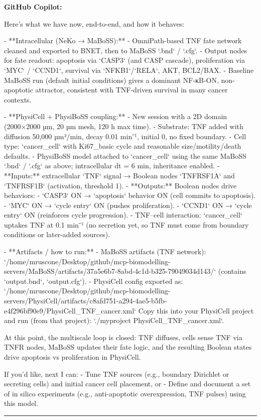 \documentclass[11pt,a4paper]{article}
\begin{document}
\begin{copilotbox}
\textbf{GitHub Copilot:}

Here’s what we have now, end-to-end, and how it behaves:

- **Intracellular (NeKo → MaBoSS):**
  - OmniPath-based TNF fate network cleaned and exported to BNET, then to MaBoSS `.bnd` / `.cfg`.
  - Output nodes for fate readout: apoptosis via `CASP3` (and CASP cascade), proliferation via `MYC` / `CCND1`, survival via `NFKB1`/`RELA`, AKT, BCL2/BAX.
  - Baseline MaBoSS run (default initial conditions) gives a dominant NF‑κB‑ON, non-apoptotic attractor, consistent with TNF‑driven survival in many cancer contexts.

- **PhysiCell + PhysiBoSS coupling:**
  - New session with a 2D domain (2000×2000 µm, 20 µm mesh, 120 h max time).
  - Substrate: TNF added with diffusion 50,000 µm²/min, decay 0.01 min⁻¹, initial 0, no fixed boundary.
  - Cell type: `cancer\_cell` with Ki67\_basic cycle and reasonable size/motility/death defaults.
  - PhysiBoSS model attached to `cancer\_cell` using the same MaBoSS `.bnd` / `.cfg` as above; intracellular dt = 6 min, inheritance enabled.
  - **Inputs:** extracellular `TNF` signal → Boolean nodes `TNFRSF1A` and `TNFRSF1B` (activation, threshold 1).
  - **Outputs:** Boolean nodes drive behaviors:
    - `CASP3` ON → `apoptosis` behavior ON (cell commits to apoptosis).
    - `MYC` ON → `cycle entry` ON (pushes proliferation).
    - `CCND1` ON → `cycle entry` ON (reinforces cycle progression).
  - TNF–cell interaction: `cancer\_cell` uptakes TNF at 0.1 min⁻¹ (no secretion yet, so TNF must come from boundary conditions or later-added sources).

- **Artifacts / how to run:**
  - MaBoSS artifacts (TNF network): `/home/mruscone/Desktop/github/mcp-biomodelling-servers/MaBoSS/artifacts/37a5e6b7-8abd-4c1d-b325-79049034d143/` (contains `output.bnd`, `output.cfg`).
  - PhysiCell config exported as:  
    `/home/mruscone/Desktop/github/mcp-biomodelling-servers/PhysiCell/artifacts/c8afd751-a294-4ae5-b5fb-e4f296bf90e9/PhysiCell\_TNF\_cancer.xml`  
    Copy this into your PhysiCell project and run (from that project): `./myproject PhysiCell\_TNF\_cancer.xml`.

At this point, the multiscale loop is closed: TNF diffuses, cells sense TNF via TNFR nodes, MaBoSS updates their fate logic, and the resulting Boolean states drive apoptosis vs proliferation in PhysiCell.

If you’d like, next I can:
- Tune TNF sources (e.g., boundary Dirichlet or secreting cells) and initial cancer cell placement, or
- Define and document a set of in silico experiments (e.g., anti-apoptotic overexpression, TNF pulses) using this model.

\end{copilotbox}
\bigskip\hrule\bigskip
\end{document}
